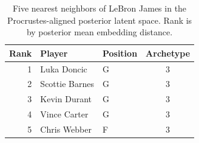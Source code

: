 \begin{table}[htbp]
  \centering\small
  \begin{tabular}{rllc}
    \toprule
    Rank & Player & Position & Archetype \\
    \midrule
    1 & Luka Doncic & G & 3 \\
    2 & Scottie Barnes & G & 3 \\
    3 & Kevin Durant & G & 3 \\
    4 & Vince Carter & G & 3 \\
    5 & Chris Webber & F & 3 \\
    \bottomrule
  \end{tabular}
  \caption{Five nearest neighbors of LeBron James in the Procrustes-aligned posterior latent space. Rank is by posterior mean embedding distance.}
  \label{tab:LeBron_James_neighbors}
\end{table}

